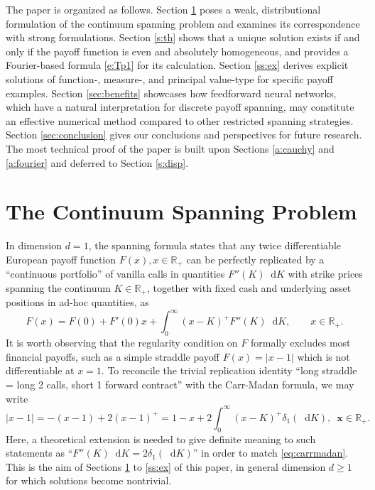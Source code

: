 \documentclass[11pt,A4,twoside]{article}
\numberwithin{equation}{section}
\renewcommand*\d{\mathop{}\!\mathrm{d}}
\newcommand{\x}{\mathbf{x}}
\newcommand{\R}{\mathbbm{R}}
\theoremstyle{definition}
\theoremstyle{remark}
\def\sp{,\;}
\def\R{\mathbb{R}}
\begin{document}
The  paper is organized as follows. 
Section \ref{s:distreq} poses a weak, distributional formulation of the continuum spanning problem and examines its correspondence with strong formulations.  Section \ref{s:th} shows that
a unique solution exists if and only if the payoff function is even and absolutely homogeneous, 
and provides a Fourier-based formula \eqref{e:Tp1} for its calculation. 
Section \ref{ss:ex} derives explicit solutions of function-, measure-, and principal value-type for specific payoff examples. 
Section \ref{sec:benefits} showcases how feedforward neural networks, which have a natural interpretation for discrete payoff spanning, may constitute an effective numerical method compared to other restricted spanning strategies.
Section \ref{sec:conclusion} gives our conclusions and perspectives for future research. 
The most technical proof of the paper is built upon Sections \ref{a:cauchy} and \ref{a:fourier} and deferred to Section \ref{s:disp}.


\section{The Continuum Spanning Problem}\label{s:distreq}

In dimension $d=1$, the \citet*{carr-madan:1998} spanning formula states that any twice differentiable European payoff function $F(x), x\in\R_+$ can be perfectly replicated by a ``continuous portfolio'' of vanilla calls in quantities $F''(K)\d K$ with strike prices spanning the continuum $K \in \R_+$, together with fixed cash and underlying asset positions in ad-hoc quantities, as 
   \begin{equation}\label{eq:carrmadan}
        F(x) = F(0) + F'(0) x + \int_0^\infty  ( x - K)^+ F''(K)\d K ,
        \qquad x \in \R_+ .
    \end{equation}
It is worth observing that the regularity condition on $F$ formally excludes most financial payoffs, such as a simple straddle payoff $F(x) = |x - 1| $ which is not differentiable at $x = 1$.  To reconcile the trivial replication identity ``long straddle = long 2 calls, short 1 forward contract'' with the Carr-Madan formula, we may write
\[
    |x - 1| =  -(x - 1) + 2(x-1)^+ = 1 - x + 2 \int_0^\infty  ( x - K)^+ \delta_1(\d K)
    \sp\  \x\in\R_+.
\]
Here, a theoretical extension is needed to give definite meaning to such statements as ``$F''(K)\d K = 2 \delta_1(\d K)$'' in order to match \eqref{eq:carrmadan}.  This is 
the aim of Sections \ref{s:distreq} to \ref{ss:ex} of this paper, in general dimension $d\geq1$ for which solutions become nontrivial.
\end{document}
